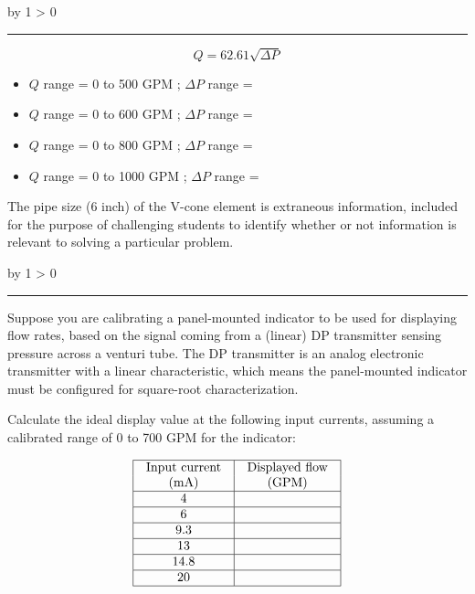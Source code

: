 \documentclass[12pt,a4paper]{article}
\def\oppgave{
            \advance\questnum by 1
            \ifnum \questnum > 0
                 \hrule
                 \vskip 3pt
                 \leftline{Oppgave \the\questnum}
                 \vskip 3pt \fi}
\def\notes{
           \advance\explnum by 1
           \ifnum \explnum > 0
                \hrule
                \vskip 3pt
                \leftline{Notes \the\explnum}
                \vskip 3pt \fi}
\begin{document}
\vskip 10pt \filbreak 





\notes{} 

$$Q = 62.61 \sqrt{\Delta P}$$

\begin{itemize}
\item{} $Q$ range = 0 to 500 GPM ; $\Delta P$ range = 
\item{} $Q$ range = 0 to 600 GPM ; $\Delta P$ range = 
\item{} $Q$ range = 0 to 800 GPM ; $\Delta P$ range = 
\item{} $Q$ range = 0 to 1000 GPM ; $\Delta P$ range = 
\end{itemize}

\vskip 10pt

The pipe size (6 inch) of the V-cone element is extraneous information, included for the purpose of challenging students to identify whether or not information is relevant to solving a particular problem.



\vfil \eject 


\oppgave{} 

Suppose you are calibrating a panel-mounted indicator to be used for displaying flow rates, based on the signal coming from a (linear) DP transmitter sensing pressure across a venturi tube.  The DP transmitter is an analog electronic transmitter with a linear characteristic, which means the panel-mounted indicator must be configured for square-root characterization.

Calculate the ideal display value at the following input currents, assuming a calibrated range of 0 to 700 GPM for the indicator:


$$\vbox{\offinterlineskip
\halign{\strut
\vrule \quad\hfil # \ \hfil & 
\vrule \quad\hfil # \ \hfil \vrule \cr
\noalign{\hrule}
%
Input current & Displayed flow \cr
(mA) & (GPM) \cr
%
\noalign{\hrule}
%
4 &  \cr
%
\noalign{\hrule}
%
6 &  \cr
%
\noalign{\hrule}
%
9.3 &  \cr
%
\noalign{\hrule}
%
13 &  \cr
%
\noalign{\hrule}
%
14.8 &  \cr
%
\noalign{\hrule}
%
20 &  \cr
%
\noalign{\hrule}
} %
}$$ %
\end{document}
